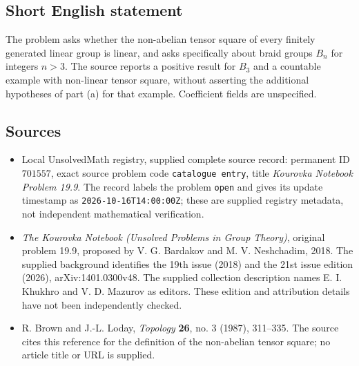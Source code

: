 \documentclass[11pt]{article}
\begin{document}
\subsection{Short English statement}
The problem asks whether the non-abelian tensor square of every finitely generated linear group is linear, and asks specifically about braid groups \(B_n\) for integers \(n>3\). The source reports a positive result for \(B_3\) and a countable example with non-linear tensor square, without asserting the additional hypotheses of part (a) for that example. Coefficient fields are unspecified.
\subsection{Sources}
\begin{itemize}
\item Local UnsolvedMath registry, supplied complete source record: permanent ID \(701557\), exact source problem code \texttt{catalogue entry}, title \emph{Kourovka Notebook Problem 19.9}. The record labels the problem \texttt{open} and gives its update timestamp as \texttt{2026-10-16T14:00:00Z}; these are supplied registry metadata, not independent mathematical verification.
\item \emph{The Kourovka Notebook (Unsolved Problems in Group Theory)}, original problem 19.9, proposed by V. G. Bardakov and M. V. Neshchadim, 2018. The supplied background identifies the 19th issue (2018) and the 21st issue edition (2026), arXiv:1401.0300v48. The supplied collection description names E. I. Khukhro and V. D. Mazurov as editors. These edition and attribution details have not been independently checked.
\item R. Brown and J.-L. Loday, \emph{Topology} \textbf{26}, no. 3 (1987), 311--335. The source cites this reference for the definition of the non-abelian tensor square; no article title or URL is supplied.
\end{itemize}
\end{document}
